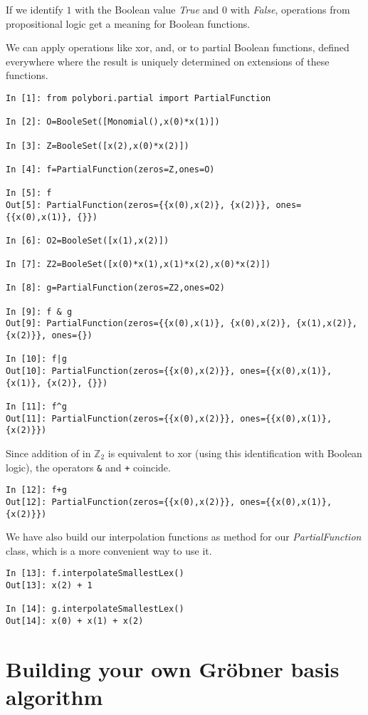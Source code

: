 \documentclass[]{article}
\newcommand{\Groebner}{Gr\"{o}bner\xspace}
\newcommand{\functionname}[1]{\textit{#1}\xspace}
\newcommand{\Ztwo}{\mathbb{Z}_2}
\newcounter{thm}
\begin{document}
If we identify $1$ with the Boolean value \functionname{True} and $0$ with \functionname{False},
operations from propositional logic get a meaning for Boolean functions.

We can apply operations like xor, and, or to partial Boolean functions, defined everywhere where the result is uniquely determined on
extensions of these functions. 

\begin{lstlisting}
In [1]: from polybori.partial import PartialFunction

In [2]: O=BooleSet([Monomial(),x(0)*x(1)])

In [3]: Z=BooleSet([x(2),x(0)*x(2)])

In [4]: f=PartialFunction(zeros=Z,ones=O)

In [5]: f
Out[5]: PartialFunction(zeros={{x(0),x(2)}, {x(2)}}, ones={{x(0),x(1)}, {}})

In [6]: O2=BooleSet([x(1),x(2)])

In [7]: Z2=BooleSet([x(0)*x(1),x(1)*x(2),x(0)*x(2)])

In [8]: g=PartialFunction(zeros=Z2,ones=O2)

In [9]: f & g
Out[9]: PartialFunction(zeros={{x(0),x(1)}, {x(0),x(2)}, {x(1),x(2)}, {x(2)}}, ones={})

In [10]: f|g
Out[10]: PartialFunction(zeros={{x(0),x(2)}}, ones={{x(0),x(1)}, {x(1)}, {x(2)}, {}})

In [11]: f^g
Out[11]: PartialFunction(zeros={{x(0),x(2)}}, ones={{x(0),x(1)}, {x(2)}})
\end{lstlisting}

Since addition of in $\Ztwo$ is equivalent to xor (using this identification with Boolean logic), the operators \lstinline|&| and \lstinline|+| coincide.
\begin{lstlisting}
In [12]: f+g
Out[12]: PartialFunction(zeros={{x(0),x(2)}}, ones={{x(0),x(1)}, {x(2)}})
\end{lstlisting}

We have also build our interpolation functions as method for our \functionname{PartialFunction} class, which is a more convenient way to use it.
\begin{lstlisting}
In [13]: f.interpolateSmallestLex()
Out[13]: x(2) + 1

In [14]: g.interpolateSmallestLex()
Out[14]: x(0) + x(1) + x(2)
\end{lstlisting}
\section{Building your own \Groebner basis algorithm}
\end{document}
